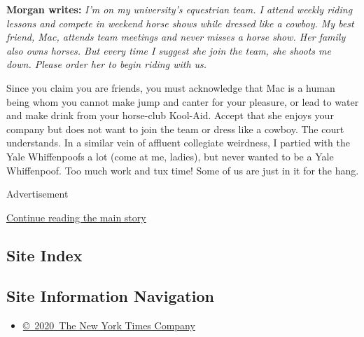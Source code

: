 \textbf{Morgan writes:} \emph{I'm on my university's equestrian team. I
attend weekly riding lessons and compete in weekend horse shows while
dressed like a cowboy. My best friend, Mac, attends team meetings and
never misses a horse show. Her family also owns horses. But every time I
suggest she join the team, she shoots me down. Please order her to begin
riding with us.}

Since you claim you are friends, you must acknowledge that Mac is a
human being whom you cannot make jump and canter for your pleasure, or
lead to water and make drink from your horse-club Kool-Aid. Accept that
she enjoys your company but does not want to join the team or dress like
a cowboy. The court understands. In a similar vein of affluent
collegiate weirdness, I partied with the Yale Whiffenpoofs a lot (come
at me, ladies), but never wanted to be a Yale Whiffenpoof. Too much work
and tux time! Some of us are just in it for the hang.

Advertisement

\protect\hyperlink{after-bottom}{Continue reading the main story}

\hypertarget{site-index}{%
\subsection{Site Index}\label{site-index}}

\hypertarget{site-information-navigation}{%
\subsection{Site Information
Navigation}\label{site-information-navigation}}

\begin{itemize}
\tightlist
\item
  \href{https://help.nytimes3xbfgragh.onion/hc/en-us/articles/115014792127-Copyright-notice}{©~2020~The
  New York Times Company}
\end{itemize}

